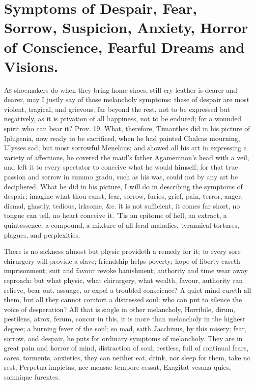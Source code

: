 {%
\section[Symptoms of Despair]{Symptoms of Despair, Fear, Sorrow, Suspicion, Anxiety, Horror of Conscience, Fearful Dreams and Visions.}

\lettrine{A}{s} shoemakers do when they bring home shoes, still cry leather is
dearer and dearer, may I justly say of those melancholy symptoms: these
of despair are most violent, tragical, and grievous, far beyond the
rest, not to be expressed but negatively, as it is privation of all
happiness, not to be endured; for a wounded spirit who can bear it?
Prov.  19. What, therefore, Timanthes did in his picture of
Iphigenia, now ready to be sacrificed, when he had painted Chalcas
mourning, Ulysses sad, but most sorrowful Menelaus; and showed all his
art in expressing a variety of affections, he covered the maid's father
Agamemnon's head with a veil, and left it to every spectator to
conceive what he would himself; for that true passion and sorrow in
summo gradu, such as his was, could not by any art be deciphered. What
he did in his picture, I will do in describing the symptoms of despair;
imagine what thou canst, fear, sorrow, furies, grief, pain, terror,
anger, dismal, ghastly, tedious, irksome, \&c. it is not sufficient, it
comes far short, no tongue can tell, no heart conceive it. 'Tis an
epitome of hell, an extract, a quintessence, a compound, a mixture of
all feral maladies, tyrannical tortures, plagues, and perplexities.

There is no sickness almost but physic provideth a remedy for it; to
every sore chirurgery will provide a slave; friendship helps poverty;
hope of liberty easeth imprisonment; suit and favour revoke banishment;
authority and time wear away reproach: but what physic, what
chirurgery, what wealth, favour, authority can relieve, bear out,
assuage, or expel a troubled conscience? A quiet mind cureth all them,
but all they cannot comfort a distressed soul: who can put to silence
the voice of desperation? All that is single in other melancholy,
Horribile, dirum, pestilens, atrox, ferum, concur in this, it is more
than melancholy in the highest degree; a burning fever of the soul; so
mad, saith Jacchinus, by this misery; fear, sorrow, and despair,
he puts for ordinary symptoms of melancholy. They are in great pain and
horror of mind, distraction of soul, restless, full of continual fears,
cares, torments, anxieties, they can neither eat, drink, nor sleep for
them, take no rest,
Perpetua impietas, nec mensae tempore cessat,
Exagitat vesana quies, somnique furentes.

}
